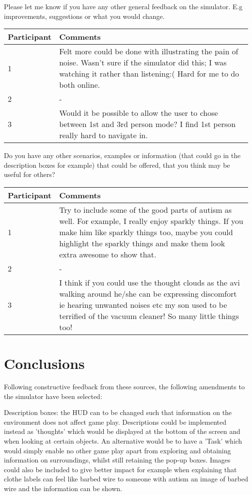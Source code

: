 Please let me know if you have any other general feedback on the simulator. E.g improvements, suggestions or what you would change.
\begin{table}[H]
    \begin{tabular}{| p{3cm} | p{12cm} |}
    \hline
     Participant & Comments \\ \hline
     1 & Felt more could be done with illustrating the pain of noise. Wasn't sure if the simulator did this; I was watching it rather than listening:( Hard for me to do both online. \\ \hline
     2 & - \\ \hline
     3 & Would it be possible to allow the user to chose between 1st and 3rd person mode? I find 1st person really hard to navigate in. \\ \hline
    \end{tabular}
\end{table}

Do you have any other scenarios, examples or information (that could go in the description boxes for example) that could be offered, that you think may be useful for others?

\begin{table}[H]
    \begin{tabular}{| p{3cm} | p{12cm} |}
    \hline
     Participant & Comments \\ \hline
     1 & Try to include some of the good parts of autism as well. For example, I really enjoy sparkly things. If you make him like sparkly things too, maybe you could highlight the sparkly things and make them look extra awesome to show that.  \\ \hline
     2 & - \\ \hline
     3 & I think if you could use the thought clouds as the avi walking around he/she can be expressing discomfort ie hearing unwanted noises etc my son used to be terrified of the vacuum cleaner! So many little things too! \\ \hline
    \end{tabular}
\end{table}


\section{Conclusions}

Following constructive feedback from these sources, the following amendments to the simulator have been selected:

Description boxes: the HUD can to be changed such that information on the environment does not affect game play. Descriptions could be implemented instead as 'thoughts' which would be displayed at the bottom of the screen and when looking at certain objects. An alternative would be to have a 'Task' which would simply enable no other game play apart from exploring and obtaining information on surroundings, whilst still retaining the pop-up boxes. Images could also be included to give better impact for example when explaining that clothe labels can feel like barbed wire to someone with autism an image of barbed wire and the information can be shown.

